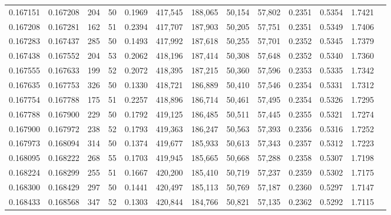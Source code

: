 \begin{tabular}{rrrrrrrrrrrrr}
0.167151 & 0.167208 &   204 &  50 &                                     0.1969 & 417,545 & 188,065 &  50,154 &  57,802 & 0.2351 & 0.5354 & 1.7421 \\
0.167208 & 0.167281 &   162 &  51 &                                     0.2394 & 417,707 & 187,903 &  50,205 &  57,751 & 0.2351 & 0.5349 & 1.7406 \\
0.167283 & 0.167437 &   285 &  50 &                                     0.1493 & 417,992 & 187,618 &  50,255 &  57,701 & 0.2352 & 0.5345 & 1.7379 \\
0.167438 & 0.167552 &   204 &  53 &                                     0.2062 & 418,196 & 187,414 &  50,308 &  57,648 & 0.2352 & 0.5340 & 1.7360 \\
0.167555 & 0.167633 &   199 &  52 &                                     0.2072 & 418,395 & 187,215 &  50,360 &  57,596 & 0.2353 & 0.5335 & 1.7342 \\
0.167635 & 0.167753 &   326 &  50 &                                     0.1330 & 418,721 & 186,889 &  50,410 &  57,546 & 0.2354 & 0.5331 & 1.7312 \\
0.167754 & 0.167788 &   175 &  51 &                                     0.2257 & 418,896 & 186,714 &  50,461 &  57,495 & 0.2354 & 0.5326 & 1.7295 \\
0.167788 & 0.167900 &   229 &  50 &                                     0.1792 & 419,125 & 186,485 &  50,511 &  57,445 & 0.2355 & 0.5321 & 1.7274 \\
0.167900 & 0.167972 &   238 &  52 &                                     0.1793 & 419,363 & 186,247 &  50,563 &  57,393 & 0.2356 & 0.5316 & 1.7252 \\
0.167973 & 0.168094 &   314 &  50 &                                     0.1374 & 419,677 & 185,933 &  50,613 &  57,343 & 0.2357 & 0.5312 & 1.7223 \\
0.168095 & 0.168222 &   268 &  55 &                                     0.1703 & 419,945 & 185,665 &  50,668 &  57,288 & 0.2358 & 0.5307 & 1.7198 \\
0.168224 & 0.168299 &   255 &  51 &                                     0.1667 & 420,200 & 185,410 &  50,719 &  57,237 & 0.2359 & 0.5302 & 1.7175 \\
0.168300 & 0.168429 &   297 &  50 &                                     0.1441 & 420,497 & 185,113 &  50,769 &  57,187 & 0.2360 & 0.5297 & 1.7147 \\
0.168433 & 0.168568 &   347 &  52 &                                     0.1303 & 420,844 & 184,766 &  50,821 &  57,135 & 0.2362 & 0.5292 & 1.7115 \\

\end{tabular}

